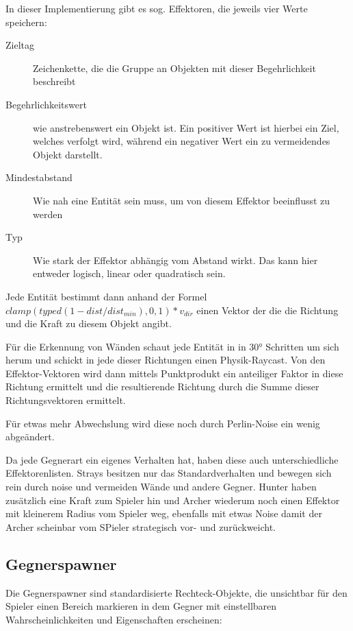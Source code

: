 \documentclass[a4paper,10pt,ngerman,fontsize=12pt]{scrreprt}
\begin{document}
In dieser Implementierung gibt es sog. Effektoren, die jeweils vier Werte speichern:

\begin{description}
\item[Zieltag] Zeichenkette, die die Gruppe an Objekten mit dieser Begehrlichkeit beschreibt
\item[Begehrlichkeitswert] wie anstrebenswert ein Objekt ist. Ein positiver Wert ist hierbei ein Ziel, welches verfolgt wird, während ein negativer Wert ein zu vermeidendes Objekt darstellt.
\item[Mindestabstand] Wie nah eine Entität sein muss, um von diesem Effektor beeinflusst zu werden
\item[Typ] Wie stark der Effektor abhängig vom Abstand wirkt. Das kann hier entweder logisch, linear oder quadratisch sein. 
\end{description}

Jede Entität bestimmt dann anhand der Formel $ clamp(typed(1 - dist / dist_{min}), 0, 1) * v_{dir} $ einen Vektor der die die Richtung und die Kraft zu diesem Objekt angibt.

Für die Erkennung von Wänden schaut jede Entität in in 30° Schritten um sich herum und schickt in jede dieser Richtungen einen Physik-Raycast. Von den Effektor-Vektoren wird dann  mittels Punktprodukt ein anteiliger Faktor in diese Richtung ermittelt und die resultierende Richtung durch die Summe dieser Richtungsvektoren ermittelt.

Für etwas mehr Abwechslung wird diese noch durch Perlin-Noise ein wenig abgeändert.

Da jede Gegnerart ein eigenes Verhalten hat, haben diese auch unterschiedliche Effektorenlisten. Strays besitzen nur das Standardverhalten und bewegen sich rein durch noise und vermeiden Wände und andere Gegner. Hunter haben zusätzlich eine Kraft zum Spieler hin und Archer wiederum noch einen Effektor mit kleinerem Radius vom Spieler weg, ebenfalls mit etwas Noise damit der Archer scheinbar vom SPieler strategisch vor- und zurückweicht.



\subsection{Gegnerspawner}
\label{subsect:spawner}

Die Gegnerspawner sind standardisierte Rechteck-Objekte, die unsichtbar für den Spieler einen Bereich markieren in dem Gegner mit einstellbaren Wahrscheinlichkeiten und Eigenschaften erscheinen:
\end{document}
